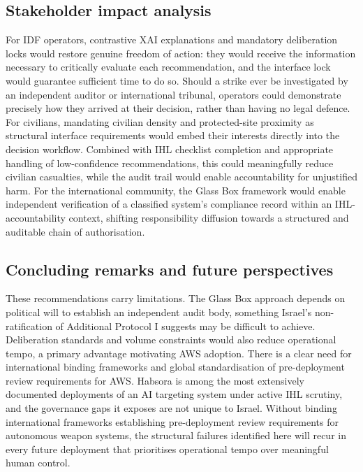\subsection{Stakeholder impact analysis}
For IDF operators, contrastive XAI explanations and mandatory deliberation locks would restore genuine freedom of action: they would receive the information necessary to critically evaluate each recommendation, and the interface lock would guarantee sufficient time to do so. Should a strike ever be investigated by an independent auditor or international tribunal, operators could demonstrate precisely how they arrived at their decision, rather than having no legal defence.
For civilians, mandating civilian density and protected-site proximity as structural interface requirements would embed their interests directly into the decision workflow. Combined with IHL checklist completion and appropriate handling of low-confidence recommendations, this could meaningfully reduce civilian casualties, while the audit trail would enable accountability for unjustified harm.
For the international community, the Glass Box framework would enable independent verification of a classified system's compliance record within an IHL-accountability context, shifting responsibility diffusion towards a structured and auditable chain of authorisation.
\subsection{Concluding remarks and future perspectives}
These recommendations carry limitations. The Glass Box approach depends on political will to establish an independent audit body, something Israel's non-ratification of Additional Protocol I suggests may be difficult to achieve. Deliberation standards and volume constraints would also reduce operational tempo, a primary advantage motivating AWS adoption.
There is a clear need for international binding frameworks and global standardisation of pre-deployment review requirements for AWS. Habsora is among the most extensively documented deployments of an AI targeting system under active IHL scrutiny, and the governance gaps it exposes are not unique to Israel. Without binding international frameworks establishing pre-deployment review requirements for autonomous weapon systems, the structural failures identified here will recur in every future deployment that prioritises operational tempo over meaningful human control.